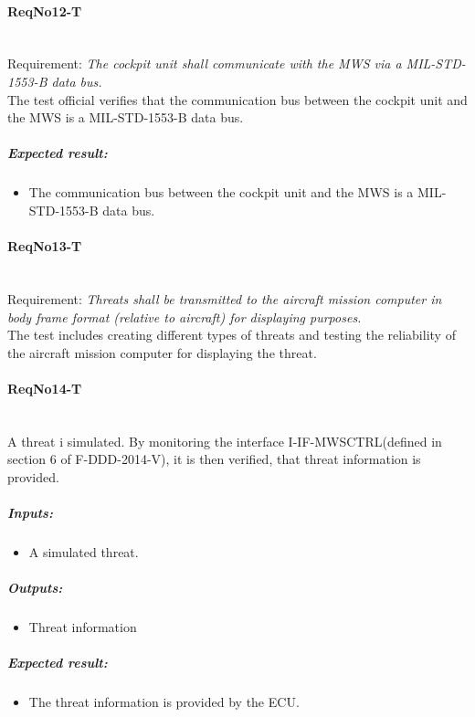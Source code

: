 \paragraph{ReqNo12-T}\mbox{}\\ %
Requirement: \textit{The cockpit unit shall communicate with the MWS via a MIL-STD-1553-B data bus.}\\
The test official verifies that the communication bus between the cockpit unit and the MWS is a MIL-STD-1553-B data bus.

\subparagraph{Expected result:}
	\begin{itemize}
	\item The communication bus between the cockpit unit and the MWS is a MIL-STD-1553-B data bus.
	\end{itemize}

\paragraph{ReqNo13-T}\mbox{}\\ %
Requirement: \textit{Threats shall be transmitted to the aircraft mission computer in body frame format (relative to aircraft) for displaying purposes.}\\
The test includes creating different types of threats and testing the reliability of the aircraft mission computer for displaying the threat.
\paragraph{ReqNo14-T}\mbox{}\\ %
A threat i simulated. By monitoring the interface I-IF-MWSCTRL(defined in section 6 of F-DDD-2014-V), it is then verified, that threat information is provided.

	\subparagraph{Inputs:}
	\begin{itemize}
	\item A simulated threat. 
	\end{itemize}
	\subparagraph{Outputs:}
	\begin{itemize}
	\item Threat information
	\end{itemize}
	\subparagraph{Expected result:}
	\begin{itemize}
	\item The threat information is provided by the ECU.
	\end{itemize}
	

